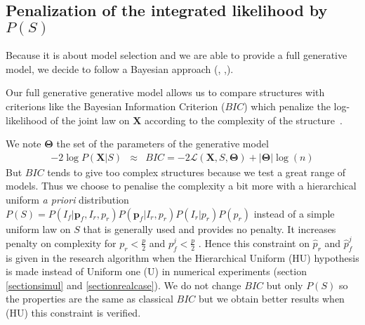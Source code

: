 \documentclass[11pt,a4paper]{article}
\begin{document}
	\subsection{Penalization of the integrated likelihood by $P(S)$} \label{compstruct}

Because it is about model selection and we are able to provide a full generative model, we decide to follow a Bayesian approach (\cite{raftery1995bayesian}, \cite{andrieu1999joint},\cite{chipman2001practical}).  
	
  Our full generative generative model allows us to compare structures with criterions like the Bayesian Information Criterion ($BIC$) which penalize the log-likelihood of the joint law on $\boldsymbol{X}$ according to the complexity of the structure~\cite{BIChuard}. 

	We note $\boldsymbol{\Theta}$ the set of the parameters of the generative model
	\begin{eqnarray}
		-2\log P(\boldsymbol{X}|S)&\approx & BIC=-2\mathcal{L}(\boldsymbol{X},S,\boldsymbol{\Theta})+|\boldsymbol{\Theta}|\log(n)  
	\end{eqnarray}
	But $BIC$ tends to give too complex structures because we test a great range of models. 
	Thus we choose to penalise the complexity a bit more with a hierarchical uniform {\it a priori} distribution $P(S)=P(I_f | \boldsymbol{p}_f,I_r,p_r)P(\boldsymbol{p}_f|I_r,p_r)P(I_r|p_r)P(p_r)$  instead of a simple uniform law on $S$ that is generally used and provides no penalty.
	It increases penalty on complexity for $p_r<\frac{p}{2}$ and $p_f^j<\frac{p}{2}$ . Hence %
	this constraint on $\hat{p}_r$ and $\hat{p}_f^j$ is given in the research algorithm when the Hierarchical Uniform (HU) hypothesis is made instead of Uniform one (U) in numerical experiments (section \ref{sectionsimul} and \ref{sectionrealcase}).
		We do not change $BIC$ but only $P(S)$ so the properties are the same as classical $BIC$ but we obtain better results when (HU) this constraint is verified.

%	
\end{document}
